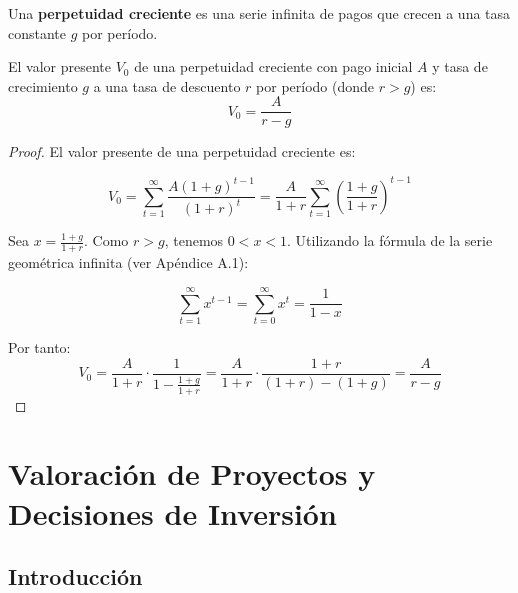 \begin{center}
    
\end{center}

\begin{definicion}
Una \textbf{perpetuidad creciente} es una serie infinita de pagos que crecen a una tasa constante $g$ por período.
\end{definicion}

\begin{teorema}
El valor presente $V_0$ de una perpetuidad creciente con pago inicial $A$ y tasa de crecimiento $g$ a una tasa de descuento $r$ por período (donde $r > g$) es:
\begin{equation}
V_0 = \frac{A}{r - g}
\end{equation}
\end{teorema}

\begin{proof}
El valor presente de una perpetuidad creciente es:

$$V_0 = \sum_{t=1}^{\infty} \frac{A(1 + g)^{t-1}}{(1 + r)^t} = \frac{A}{1 + r} \sum_{t=1}^{\infty} \left(\frac{1 + g}{1 + r}\right)^{t-1}$$

Sea $x = \frac{1 + g}{1 + r}$. Como $r > g$, tenemos $0 < x < 1$. Utilizando la fórmula de la serie geométrica infinita (ver Apéndice A.1):

$$\sum_{t=1}^{\infty} x^{t-1} = \sum_{t=0}^{\infty} x^t = \frac{1}{1 - x}$$

Por tanto:
$$V_0 = \frac{A}{1 + r} \cdot \frac{1}{1 - \frac{1 + g}{1 + r}} = \frac{A}{1 + r} \cdot \frac{1 + r}{(1 + r) - (1 + g)} = \frac{A}{r - g}$$
\end{proof}

\begin{center}
    
\end{center}

\section{Valoración de Proyectos y Decisiones de Inversión}

\subsection{Introducción}

